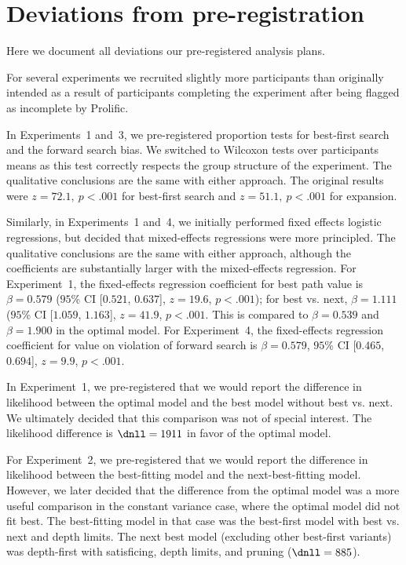 
\label{app:planning}

\section{Deviations from pre-registration}\label{app:planning-deviations}
Here we document all deviations our pre-registered analysis plans.

For several experiments we recruited slightly more participants than originally intended as a result of participants completing the experiment after being flagged as incomplete by Prolific.

In Experiments~1 and~3, we pre-registered proportion tests for best-first search and the forward search bias. We switched to Wilcoxon tests over participants means as this test correctly respects the group structure of the experiment. The qualitative conclusions are the same with either approach. The original results were $z=72.1,\ p < .001$ for best-first search and $z=51.1,\ p < .001$ for expansion.

Similarly, in Experiments~1 and~4, we initially performed fixed effects logistic regressions, but decided that mixed-effects regressions were more principled. The qualitative conclusions are the same with either approach, although the coefficients are substantially larger with the mixed-effects regression. For Experiment~1, the fixed-effects regression coefficient for best path value is $\beta = 0.579$ ($95$\% CI [$0.521$, $0.637$], $z = 19.6$, $p < .001$); for best vs. next, $\beta = 1.111$ ($95$\% CI [$1.059$, $1.163$], $z = 41.9$, $p < .001$. This is compared to $\beta = 0.539$ and $\beta = 1.900$ in the optimal model. For Experiment~4, the fixed-effects regression coefficient for value on violation of forward search is $\beta = 0.579$, $95$\% CI [$0.465$, $0.694$], $z = 9.9$, $p < .001$.

In Experiment~1, we pre-registered that we would report the difference in likelihood between the optimal model and the best model without best vs. next. We ultimately decided that this comparison was not of special interest. The likelihood difference is $\dnll = 1911$ in favor of the optimal model.

For Experiment~2, we pre-registered that we would report the difference in likelihood between the best-fitting model and the next-best-fitting model. However, we later decided that the difference from the optimal model was a more useful comparison in the constant variance case, where the optimal model did not fit best. The best-fitting model in that case was the best-first model with best vs. next and depth limits. The next best model (excluding other best-first variants) was depth-first with satisficing, depth limits, and pruning ($\dnll = 885$).

